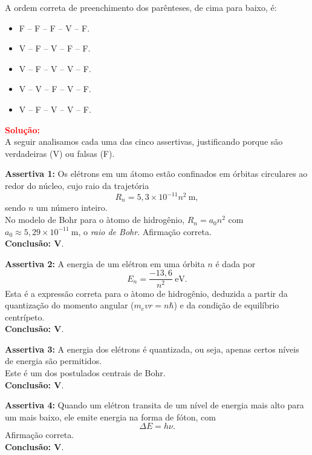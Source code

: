 \begin{flushleft}
A ordem correta de preenchimento dos par\^enteses, de cima para baixo, \'e:

\begin{itemize}
\item[(A)] F -- F -- F -- V -- F.
\item[(B)] V -- F -- V -- F -- F.
\item[(C)] V -- F -- V -- V -- F.
\item[(D)] V -- V -- F -- V -- F.
\item[(E)] V -- F -- V -- V -- F.
\end{itemize}

\vspace{0.5cm}

\textcolor{red}{\textbf{Solu\c{c}\~ao:}}\\

A seguir analisamos cada uma das cinco assertivas, justificando porque s\~ao verdadeiras (V) ou falsas (F).

\bigskip

\textbf{Assertiva 1:} Os el\'etrons em um \'atomo est\~ao confinados em \'orbitas circulares ao redor do n\'ucleo, cujo raio da trajet\'oria 
\[
R_n = 5{,}3\times 10^{-11} n^2 \ \text{m},
\]
sendo $n$ um n\'umero inteiro.\\
No modelo de Bohr para o \`atomo de hidrog\^enio, $R_n = a_0 n^2$ com $a_0 \approx 5{,}29\times 10^{-11} \ \text{m}$, o \emph{raio de Bohr}. Afirma\c{c}\~ao correta.\\
\textbf{Conclus\~ao: V}.

\bigskip

\textbf{Assertiva 2:} A energia de um el\'etron em uma \'orbita $n$ \'e dada por 
\[
E_n = \frac{-13{,}6}{n^2} \ \text{eV}.
\]
Esta \'e a express\~ao correta para o \`atomo de hidrog\^enio, deduzida a partir da quantiza\c{c}\~ao do momento angular ($m_e v r = n\hbar$) e da condi\c{c}\~ao de equil\'ibrio centr\'ipeto.\\
\textbf{Conclus\~ao: V}.

\bigskip

\textbf{Assertiva 3:} A energia dos el\'etrons \'e quantizada, ou seja, apenas certos n\'iveis de energia s\~ao permitidos.\\
Este \'e um dos postulados centrais de Bohr.\\
\textbf{Conclus\~ao: V}.

\bigskip

\textbf{Assertiva 4:} Quando um el\'etron transita de um n\'ivel de energia mais alto para um mais baixo, ele emite energia na forma de f\'oton, com
\[
\Delta E = h\nu.
\]
Afirma\c{c}\~ao correta.\\
\textbf{Conclus\~ao: V}.


\end{flushleft}
